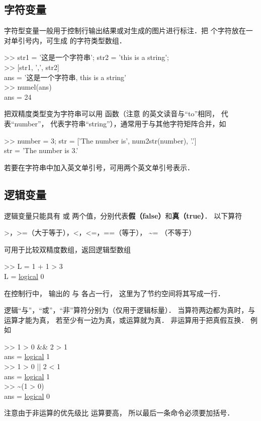 \subsection{字符变量}

字符型变量一般用于控制行输出结果或对生成的图片进行标注．把  个字符放在一对单引号内，可生成  的字符类型数组．
\begin{Command}
>> str1 = {\color{string}'\!这是一个字符串'}; str2 = {\color{string}'this is a string'};\\
>> [str1, {\color{string}','}, str2] \\
ans = '\!这是一个字符串, this is a string'\\
>> numel(ans) \\
ans = 24
\end{Command}
把双精度类型变为字符串可以用  函数（注意  的英文读音与“to”相同，  代表“number”，  代表字符串“string”），通常用于与其他字符矩阵合并，如
\begin{Command}
>> number = 3; str = [{\color{string}'The number is'}, num2str(number), {\color{string}'.'}] \\
str = 'The number is 3.'
\end{Command}
若要在字符串中加入英文单引号，可用两个英文单引号表示．

\subsection{逻辑变量}

逻辑变量只能具有  或  两个值，分别代表\textbf{假（false）}和\textbf{真（true）}． 以下算符
\begin{Command}
>，>=（大于等于），<，<=，==（等于）， \~{}= （不等于）
\end{Command}
可用于比较双精度数组，返回逻辑型数组
\begin{Command}
>> L = 1 + 1 > 3 \\
L = {\color{blue}\underline{logical}} 0
\end{Command}
在控制行中， 输出的  与  各占一行， 这里为了节约空间将其写成一行．

逻辑“与”，“或”，“非”算符分别为（仅用于逻辑标量）． 当算符两边都为真时，与运算才能为真， 若至少有一边为真，或运算就为真． 非运算用于把真假互换． 例如
\begin{Command}
>> 1 > 0 \&\& 2 > 1 \\
ans = {\color{blue}\underline{logical}} 1\\
>> 1 > 0 || 2 < 1 \\
ans = {\color{blue}\underline{logical}} 1\\
>> \~ {}(1 > 0)\\
ans = {\color{blue}\underline{logical}} 0
\end{Command}
注意由于非运算的优先级比 \x{>} 运算要高， 所以最后一条命令必须要加括号．


